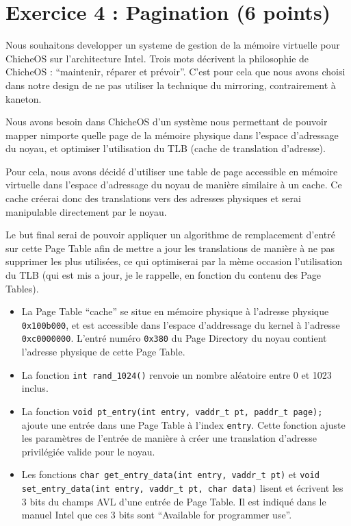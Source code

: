 \section*{Exercice 4 : Pagination (6 points)}

Nous souhaitons developper un systeme de gestion de la m\'emoire virtuelle
pour ChicheOS sur l'architecture Intel. Trois mots d\'ecrivent la philosophie
de ChicheOS :
``maintenir, r\'eparer et pr\'evoir''. C'est pour cela que nous avons choisi
dans notre design de ne pas utiliser la technique du mirroring, contrairement
\`a kaneton.

Nous avons besoin dans ChicheOS d'un syst\`eme nous permettant de pouvoir
mapper nimporte quelle page de la m\'emoire physique dans l'espace d'adressage
du noyau, et optimiser l'utilisation du TLB (cache de translation d'adresse).

Pour cela, nous avons d\'ecid\'e d'utiliser une table de page accessible en
m\'emoire virtuelle dans l'espace d'adressage du noyau de mani\`ere similaire
\`a un cache. Ce cache cr\'eerai donc des translations vers des
adresses physiques et serai manipulable directement par le noyau.

Le but
final serai de pouvoir appliquer un algorithme de remplacement d'entr\'e
sur cette Page Table afin de mettre a jour les translations de mani\`ere
\`a ne pas supprimer les plus utilis\'ees, ce qui optimiserai par la m\`eme
occasion l'utilisation du TLB (qui est mis a jour, je le rappelle, en
fonction du contenu des Page Tables).

\begin{itemize}
  \item La Page Table ``cache'' se situe en m\'emoire physique \`a l'adresse
  physique \verb+0x100b000+, et est accessible dans l'espace d'addressage du
  kernel \`a l'adresse \verb+0xc0000000+. L'entr\'e num\'ero \verb+0x380+ du
  Page Directory du noyau contient l'adresse physique de cette Page Table.
  \item La fonction \verb+int rand_1024()+ renvoie un nombre al\'eatoire entre
  0 et 1023 inclus.
  \item La fonction \verb+void pt_entry(int entry, vaddr_t pt, paddr_t page);+ ajoute une
  entr\'ee dans une Page Table \`a l'index \verb+entry+. Cette fonction ajuste
  les param\`etres de l'entr\'ee de mani\`ere \`a cr\'eer une translation
  d'adresse privil\'egi\'ee valide pour le noyau.
  \item Les fonctions \verb+char get_entry_data(int entry, vaddr_t pt)+ et
  \verb+void set_entry_data(int entry, vaddr_t pt, char data)+ lisent et
  \'ecrivent les 3 bits du champs AVL d'une entr\'ee de Page Table. Il est
  indiqu\'e dans le manuel Intel que ces 3 bits sont ``Available for
  programmer use''.
\end{itemize}

